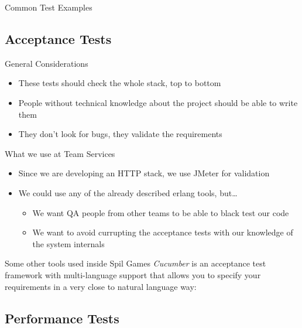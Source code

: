 \documentclass[]{beamer}
\begin{document}
\begin{frame}{Common Test Examples}
\end{frame}

\subsection*{Acceptance Tests}
\label{acceptance_tests}

\begin{frame}{General Considerations}
    \begin{itemize}
    \item These tests should check the whole stack, top to bottom
    \pause
    \item People without technical knowledge about the project should be able to write them
    \pause
    \item They don't look for bugs, they validate the requirements
    \end{itemize}
\end{frame}

\begin{frame}{What we use at Team Services}
    \begin{itemize}
    \item Since we are developing an HTTP stack, we use JMeter for validation
    \pause
    \item We could use any of the already described erlang tools, but\dots
    \pause
        \begin{itemize}
        \item We want QA people from other teams to be able to black test our code
        \item We want to avoid currupting the acceptance tests with our knowledge of the system internals
        \end{itemize}
    \end{itemize}
\end{frame}

\begin{frame}{Some other tools used inside Spil Games}
    \emph{Cucumber} is an acceptance test framework with multi-language support that allows you to specify your
    requirements in a very close to natural language way:
\end{frame}

\subsection*{Performance Tests}
\label{performance_tests}
\end{document}
